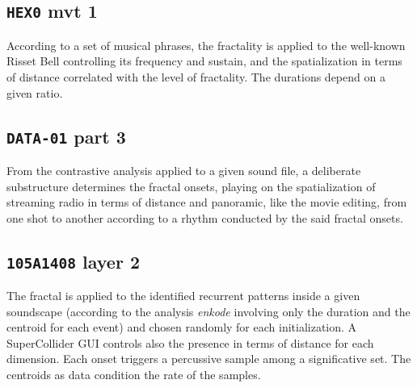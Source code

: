 \documentclass{article}
\begin{document}
\subsection*{\texttt{HEX0} mvt 1 \textnormal{\cite[Section 8.2]{yx}}}
\vspace{-1mm}
According to a set of musical phrases, the fractality is applied to the well-known Risset Bell controlling its frequency and sustain, and the spatialization in terms of distance correlated with the level of fractality. The durations depend on a given ratio. 
\vspace{-1mm}

\subsection*{\texttt{DATA-01} part 3 \textnormal{\cite[Section 8.4]{yx}}} \vspace{-1mm}
From the contrastive analysis \cite[Section 4.4]{yx} applied to a given sound file, a deliberate substructure determines the fractal onsets, playing on the spatialization of streaming radio in terms of distance and panoramic, like the movie editing, from one shot to another according to a rhythm conducted by the said fractal onsets. 
\vspace{-1mm}

\subsection*{\texttt{105A1408} layer 2 \textnormal{\cite[Section 8.6]{yx}}}
\vspace{-1mm}
The fractal is applied to the identified recurrent patterns inside a given soundscape (according to the analysis \textsl{enkode} \cite[Chapter 1]{yx} involving only the duration and the centroid for each event) and chosen randomly for each initialization. A SuperCollider GUI \cite[Figure 8.11]{yx} controls also the presence in terms of distance for each dimension. 
Each onset triggers a percussive sample among a significative set. The centroids as data condition the rate of the samples. %

\bigskip
\end{document}
